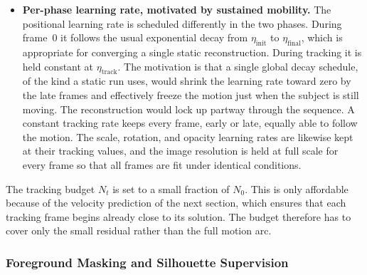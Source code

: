 \begin{itemize}
\item \textbf{Per-phase learning rate, motivated by sustained mobility.} The positional
learning rate is scheduled differently in the two phases. During frame~$0$ it follows
the usual exponential decay from $\eta_{\text{init}}$ to $\eta_{\text{final}}$, which
is appropriate for converging a single static reconstruction. During tracking it is
held constant at $\eta_{\text{track}}$. The motivation is that a single global
decay schedule, of the kind a static run uses, would shrink the learning rate toward
zero by the late frames and effectively freeze the motion just when the subject is
still moving. The reconstruction would lock up partway through the sequence. A
constant tracking rate keeps every frame, early or late, equally able to follow the
motion. The scale, rotation, and opacity learning rates are likewise kept at their
tracking values, and the image resolution is held at full scale for every frame so
that all frames are fit under identical conditions.

\end{itemize}

The tracking budget $N_t$ is set to a small fraction of $N_0$. This is only
affordable because of the velocity prediction of the next section, which ensures that
each tracking frame begins already close to its solution. The budget therefore has to
cover only the small residual rather than the full motion arc.

\subsubsection{Foreground Masking and Silhouette Supervision}
\label{sec:masking}

